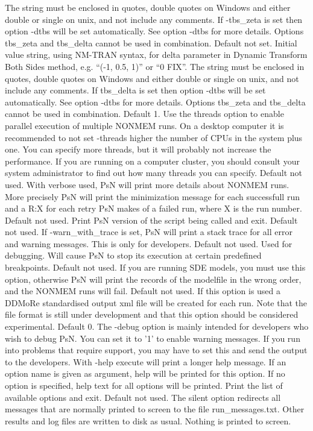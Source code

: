 \begin{optionlist}
The string must be enclosed in quotes, double quotes on Windows and either double or single on unix, and not include any comments.
If -tbs\_zeta is set then option -dtbs will be set automatically. See option -dtbs for more details. Options tbs\_zeta and tbs\_delta cannot be used in combination.  
\nextopt
{}
Default not set. Initial value string, using NM-TRAN syntax, for delta parameter in Dynamic Transform Both Sides method, e.g. ``(-1, 0.5, 1)'' or ``0 FIX''. 
The string must be enclosed in quotes, double quotes on Windows and either double or single on unix, and not include any comments.
If tbs\_delta is set then option -dtbs will be set automatically. See option -dtbs for more details. Options tbs\_zeta and tbs\_delta cannot be used in combination.  
\nextopt
{}
Default 1. Use the threads option to enable parallel execution of multiple NONMEM runs. On a desktop computer it is recommended to not set -threads higher the number of CPUs in the system plus one. You can specify more threads, but it will probably not increase the performance. If you are running on a computer cluster, you should consult your system administrator to find out how many threads you can specify. 
\nextopt
{}
Default not used. With verbose used, PsN will print more details about NONMEM runs. More precisely PsN will print the minimization message for each successfull run and a R:X for each retry PsN makes of a failed run, where X is the run number. 
\nextopt
{}
Default not used. Print PsN version of the script being called and exit. 
\nextopt
{}
Default not used. If -warn\_with\_trace is set, PsN will print a stack trace for all error and warning messages. This is only for developers. 
\nextopt
{}
Default not used. Used for debugging. Will cause PsN to stop its execution at certain predefined breakpoints.
\nextopt
{}
Default not used. If you are running SDE models, you must use this option, otherwise PsN will print the records of the modelfile in the wrong order, and the NONMEM runs will fail. 
\nextopt
{}
Default not used. If this option is used a DDMoRe standardised output xml file will be created for each run. Note that the file format is still under development and that this option should be considered experimental.
\nextopt
{}
Default 0. The -debug option is mainly intended for developers who wish to debug PsN. You can set it to '1' to enable warning messages. If you run into problems that require support, you may have to set this and send the output to the developers. 
\nextopt
{}
With -help execute will print a longer help message. If an option name is given as argument, help will be printed for this option. If no option is specified, help text for all options will be printed. 
\nextopt
{}
Print the list of available options and exit. 
\nextopt
{}
Default not used. The silent option redirects all messages that are normally printed to screen to the file run\_messages.txt. Other results and log files are written to disk as usual. Nothing is printed to screen. 
\nextopt
\end{optionlist}


